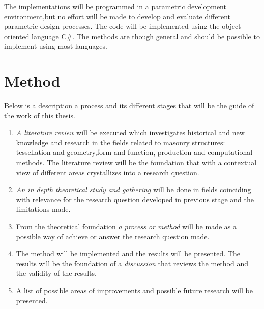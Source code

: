 The implementations will be programmed in a parametric development environment,but no effort will be made to develop and evaluate different parametric design processes. The code will be implemented using the object-oriented language C\#. The methods are though general and should be possible to implement using most languages. 

\section{Method} \label{Sec:method}

Below is a description a process and its  different stages that will be the guide of the work of this thesis.

\begin{enumerate}

\item \textit{A literature review} will be executed which investigates historical and new knowledge and research in the fields related to masonry structures: tessellation and geometry,form and function, production  and computational methods. The literature review will be the foundation that with a contextual view of different areas crystallizes into a research question.
\item \textit{ An in depth theoretical study and gathering} will be done in fields coinciding with relevance for the research question developed in previous stage and the limitations made.  
\item From the theoretical foundation \textit{a process or method} will be made as a possible way of achieve or answer the research question made.
\item The method will be implemented and the results will be presented. The results will be the foundation of a \textit{discussion} that reviews the method and the validity of the results.
\item A list of possible areas of improvements and possible future research will be presented.
\end{enumerate}
